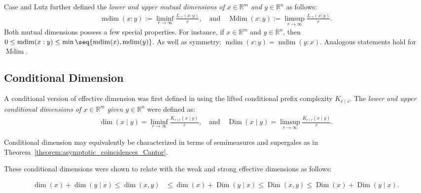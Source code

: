 Case and Lutz further defined the \textit{lower and upper mutual dimensions of $x \in \mathbb{R}^m$ and $y \in \mathbb{R}^n$} as follows:
\begin{align*}
    \operatorname{mdim}(x : y) := \liminf_{r \to \infty} \frac{I_{r : r}(x : y)}{r}, \quad \text{and} \quad \operatorname{Mdim}(x : y) := \limsup_{r \to \infty} \frac{I_{r : r}(x : y)}{r}.
\end{align*}
Both mutual dimensions possess a few special properties. For instance, if $x \in \mathbb{R}^m$ and $y \in \mathbb{R}^n$, then $0 \leq \operatorname{mdim}(x : y) \leq \min \seq{\operatorname{mdim}(x), \operatorname{mdim}(y)}$. As well as symmetry: $\operatorname{mdim}(x : y) = \operatorname{mdim}(y : x)$. Analogous statements hold for $\operatorname{Mdim}$. 

\subsection{Conditional Dimension}
A conditional version of effective dimension was first defined in \cite{LL18} using the lifted conditional prefix complexity $K_{r \mid s}$. The \textit{lower and upper conditional dimensions of $x \in \mathbb{R}^m$ given $y \in \mathbb{R}^n$} were defined as:
\begin{align*}
    \dim(x \mid y) = \liminf_{r \to \infty} \frac{K_{r \mid r}(x \mid y)}{r}, \quad \text{and} \quad \operatorname{Dim}(x \mid y) = \limsup_{r \to \infty} \frac{K_{r \mid r}(x \mid y)}{r}.
\end{align*}

Conditional dimension may equivalently be characterized in terms of semimeasures and supergales as in Theorem~\ref{theorem:asymptotic_coincidences_Cantor}. 

These conditional dimensions were shown to relate with the weak and strong effective dimensions as follows:
\begin{theorem}
    \small 
    \begin{align*}
        \dim(x) + \dim(y \mid x) \leq \dim(x, y) &\leq \dim(x) + \operatorname{Dim}(y \mid x) \leq \operatorname{Dim}(x, y) \leq \operatorname{Dim}(x) + \operatorname{Dim}(y \mid x).
    \end{align*}
\end{theorem}

